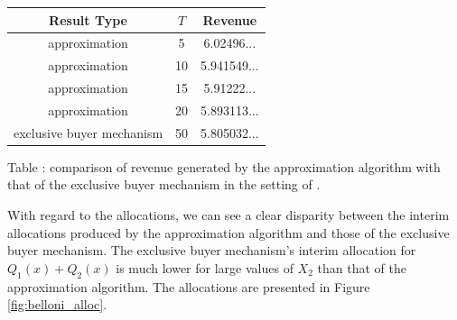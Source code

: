 \begin{center}
    \begin{tabular}{ |c|c|c| } 
    \hline
    Result Type & $T$ & Revenue \\
    \hline
    \hline
    approximation & 5 & 6.02496... \\ 
    approximation & 10 & 5.941549... \\ 
    approximation & 15 & 5.91222... \\ 
    approximation & 20 & 5.893113... \\ 
    exclusive buyer mechanism & 50 & 5.805032... \\
    \hline
    \end{tabular}

    \vspace{1mm}
    \raggedright{\small {\sc Table \thefig\label{table:asymm_belloni}:} comparison of revenue generated by the approximation algorithm with that of the exclusive buyer mechanism in the setting of \autocite{belloni2010multidimensional}.}
\end{center}

With regard to the allocations, we can see a clear disparity between the interim allocations produced by the approximation algorithm and those of the exclusive buyer mechanism. The exclusive buyer mechanism's interim allocation for $Q_1(x) + Q_2(x)$ is much lower for large values of $X_2$ than that of the approximation algorithm. The allocations are presented in Figure \ref{fig:belloni_alloc}.

